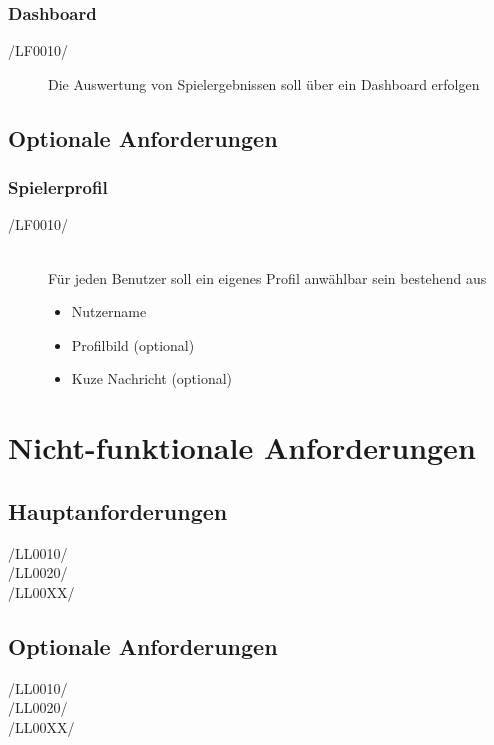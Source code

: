 \documentclass[11pt,a4paper]{scrreprt}
\begin{document}
\subsection{Dashboard}
\begin{description}
\item[/LF0010/] Die Auswertung von Spielergebnissen soll über ein Dashboard erfolgen
\end{description}
\section{Optionale Anforderungen}
\subsection{Spielerprofil}
\begin{description}
\item[/LF0010/] \ \\ 
Für jeden Benutzer soll ein eigenes Profil anwählbar sein bestehend aus
	\begin{itemize}
	\item Nutzername
	\item Profilbild (optional)
	\item Kuze Nachricht (optional)
	\end{itemize}
\end{description}
\chapter{Nicht-funktionale Anforderungen}
\section{Hauptanforderungen}
\begin{description}
\item[/LL0010/]
\item[/LL0020/]
\item[/LL00XX/]
\end{description}
\section{Optionale Anforderungen}
\begin{description}
\item[/LL0010/]
\item[/LL0020/]
\item[/LL00XX/]
\end{description}
\end{document}

